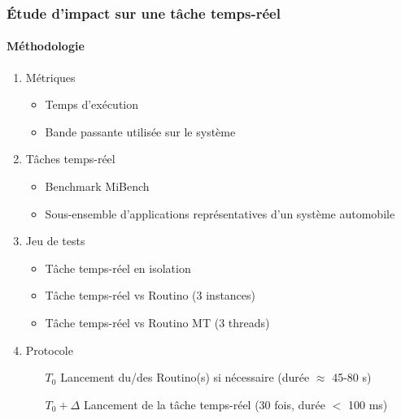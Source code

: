 
\begin{frame}
  \frametitle{\'Etude d'impact sur une tâche temps-réel}
  \framesubtitle{Méthodologie}
  \begin{enumerate}
  \item<1-> Métriques
    \begin{itemize}
    \item Temps d'exécution
    \item Bande passante utilisée sur le système
    \end{itemize}
  \item<2-> Tâches temps-réel
    \begin{itemize}
    \item Benchmark MiBench
    \item Sous-ensemble d'applications représentatives d'un système automobile
    \end{itemize}
  \item<3-> Jeu de tests
    \begin{itemize}
    \item Tâche temps-réel en isolation
    \item Tâche temps-réel vs Routino (3 instances)
    \item Tâche temps-réel vs Routino MT (3 threads)
    \end{itemize}
  \item<4> Protocole
    \begin{itemize}
    \item[$T_0$] Lancement du/des Routino(s) si nécessaire (durée $\approx$
      45-80 s)
    \item[$T_0+\Delta$] Lancement de la tâche temps-réel (30 fois, durée $<$ 100 ms)
    \end{itemize}
  \end{enumerate}
\end{frame}


